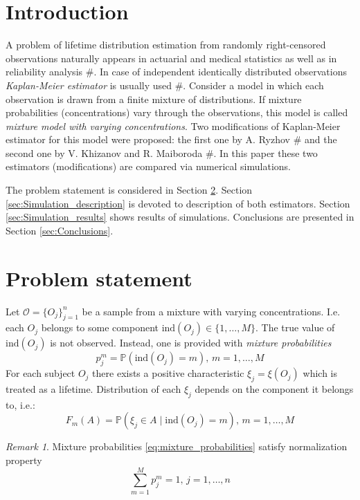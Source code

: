 \documentclass[12pt,reqno,a4paper,oneside]{article}
\theoremstyle{plain}
\theoremstyle{definition}
\theoremstyle{remark}
\newtheorem*{rem}{Remark}
\begin{document}
\tableofcontents


\section{Introduction}
\label{sec:Introduction}
A problem of lifetime distribution estimation from randomly right-censored observations naturally appears in actuarial and medical statistics as well as in reliability analysis $\#$. In case of independent identically distributed observations \emph{Kaplan-Meier estimator} is usually used $\#$. Consider a model in which each observation is drawn from a finite mixture of distributions. If mixture probabilities (concentrations) vary through the observations, this model is called \emph{mixture model with varying concentrations}. Two modifications of Kaplan-Meier estimator for this model were proposed: the first one by A. Ryzhov $\#$ and the second one by V. Khizanov and R. Maiboroda $\#$. In this paper these two estimators (modifications) are compared via numerical simulations.

The problem statement is considered in Section \ref{sec:Problem_statement}. Section \ref{sec:Simulation_description} is devoted to description of both estimators. Section \ref{sec:Simulation_results} shows results of simulations. Conclusions are presented in Section \ref{sec:Conclusions}.

\section{Problem statement}
\label{sec:Problem_statement}
Let $\mathcal O = \{O_j\}_{j=1}^n$ be a sample from a mixture with varying concentrations. I.e. each $O_j$ belongs to some component $\mathrm{ind}(O_j)\in \{1,\ldots ,M\}$. The true value of $\mathrm{ind}(O_j)$ is not observed. Instead, one is provided with \emph{mixture probabilities}
\begin{equation}
\label{eq:mixture_probabilities}
p_j^m = \mathbb P(\mathrm{ind}(O_j) = m), \, m=1,\ldots, M
\end{equation}
For each subject $O_j$ there exists a positive characteristic $\xi _j = \xi (O_j)$ which is treated as a lifetime. Distribution of each $\xi _j$ depends on the component it belongs to, i.e.:
\begin{equation}
\label{eq:conditional_distribution}
F_m (A) = \mathbb P(\xi _j \in A \mid \mathrm{ind}(O_j) = m), \, m=1,\ldots , M
\end{equation}
\begin{rem}
Mixture probabilities \eqref{eq:mixture_probabilities} satisfy normalization property
\begin{equation}
\label{eq:mix_prob_constraint}
\sum _{m=1}^M p_j^m = 1, \, j = 1,\ldots, n
\end{equation}
\end{rem}
\end{document}
